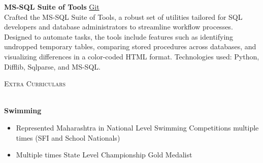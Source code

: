 \documentclass[a4paper]{article}
\newcommand{\lineunder} {
\vspace*{-8pt} \\
\hspace*{-18pt} \hrulefill \\
}
\newcommand{\header} [1] {
{\hspace*{-18pt}\vspace*{6pt} \textsc{#1}}
\vspace*{-6pt} \lineunder
}
\begin{document}
{\textbf{MS-SQL Suite of Tools }}\hfill \href{https://github.com/swarnimcodes/Sequel}{Git}\\
Crafted the MS-SQL Suite of Tools, a robust set of utilities tailored for SQL developers and database administrators to streamline workflow processes. Designed to automate tasks, the tools include features such as identifying undropped temporary tables, comparing stored procedures across databases, and visualizing differences in a color-coded HTML format. Technologies used: Python, Difflib, Sqlparse, and MS-SQL.\\
\vspace*{2mm}

\vspace{2mm}
\header{Extra Curriculars}
\vspace{1mm}

\textbf{Swimming} 
\vspace{-1mm}
\begin{itemize} \itemsep 1pt
\item Represented Maharashtra in National Level Swimming Competitions multiple times (SFI and School Nationals)
\item Multiple times State Level Championship Gold Medalist
\end{itemize}
\end{document}
